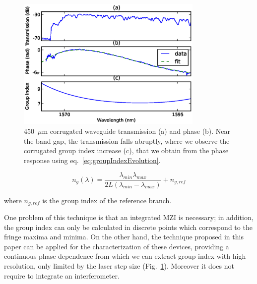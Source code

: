 \documentclass[journal]{IEEEtran}
\begin{document}
\begin{figure}[htb]
  \centerline{\includegraphics[width=9cm]{corrAmpPhaseResponseGroupIndex}}
  \caption{450~$\mu$m corrugated waveguide transmission (a) and phase (b). Near the band-gap, the transmission falls abruptly, where we observe the corrugated group index increase (c), that we obtain from the phase response using eq.~\ref{eq:groupIndexEvolution}.}  
 

  \label{fig:corr}
\end{figure}

\begin{equation}
  n_g (\lambda)=\frac{\lambda_{min} \lambda_{max}}{ 2L (\lambda_{min} - \lambda_{max})} + n_{g,ref}
\label{eq:fringes}
\end{equation}

where $n_{g,ref}$ is the group index of the reference branch.

One problem of this technique is that an integrated MZI is necessary; in addition, the group index can only be calculated in discrete points which correspond to the fringe maxima and minima. On the other hand, the technique proposed in this paper can be applied for the characterization of these devices, providing a continuous phase dependence from which we can extract group index with high resolution, only limited by the laser step size (Fig.~\ref{fig:corr}). Moreover it does not require to integrate an interferometer.
\end{document}
